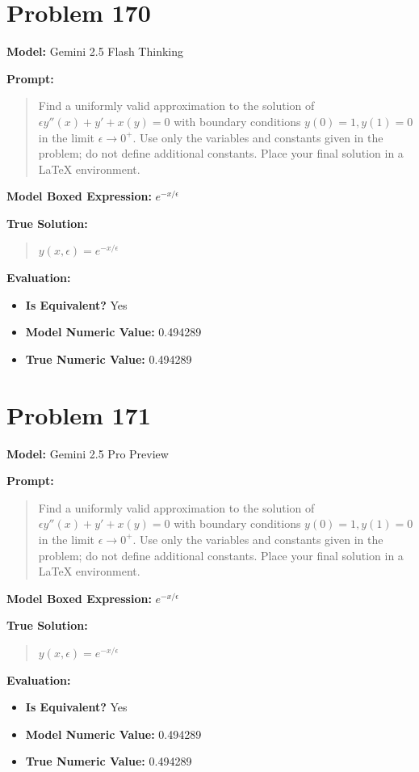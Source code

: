 \documentclass{article}
\begin{document}
{\section*{Problem 170}
\textbf{Model:} Gemini 2.5 Flash Thinking

\textbf{Prompt:}
\begin{quote}
Find a uniformly valid approximation to the solution of $\epsilon y''(x) + y' + x(y) = 0$ with boundary conditions $y(0) = 1, y(1) = 0$ in the limit $\epsilon \to 0^+$. Use only the variables and constants given in the problem; do not define additional constants. Place your final solution in a $\boxed{}$ LaTeX environment.
\end{quote}
\textbf{Model Boxed Expression:} $e^{-x/\epsilon}$

\textbf{True Solution:}
\begin{quote}
$y(x,\epsilon) = e^{-x/\epsilon}$
\end{quote}

\textbf{Evaluation:}
\begin{itemize}
\item \textbf{Is Equivalent?} Yes
\item \textbf{Model Numeric Value:} 0.494289
\item \textbf{True Numeric Value:} 0.494289
\end{itemize}
\vspace{1cm}
\section*{Problem 171}
\textbf{Model:} Gemini 2.5 Pro Preview

\textbf{Prompt:}
\begin{quote}
Find a uniformly valid approximation to the solution of $\epsilon y''(x) + y' + x(y) = 0$ with boundary conditions $y(0) = 1, y(1) = 0$ in the limit $\epsilon \to 0^+$. Use only the variables and constants given in the problem; do not define additional constants. Place your final solution in a $\boxed{}$ LaTeX environment.
\end{quote}
\textbf{Model Boxed Expression:} $e^{-x/\epsilon}$

\textbf{True Solution:}
\begin{quote}
$y(x,\epsilon) = e^{-x/\epsilon}$
\end{quote}

\textbf{Evaluation:}
\begin{itemize}
\item \textbf{Is Equivalent?} Yes
\item \textbf{Model Numeric Value:} 0.494289
\item \textbf{True Numeric Value:} 0.494289
\end{itemize}
\vspace{1cm}
}
\end{document}
